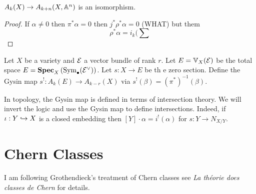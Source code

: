 \documentclass[12pt]{article}
\begin{document}
\begin{cor}
$A_k(X) \to A_{k+n}(X, \mathbb{A}^n)$ is an isomorphism. 
\end{cor}

\begin{proof}
If $\alpha \neq 0$ then $\pi^* \alpha = 0$ then $j^* \rho^* \alpha = 0$ (WHAT) but them
\[ \rho^* \alpha = i_k (\sum \]
\end{proof}

\newcommand{\V}{\mathbb{V}}

\begin{defn}
Let $X$ be a variety and $\mathcal{E}$ a vector bundle of rank $r$. Let $E = \V_X(\E)$ be the total space $E = \mathbf{Spec}_{X}\left( \mathrm{Sym}_{\bullet}\! \left( \mathcal{E}^\vee \right) \right)$. Let $s : X \to E$ be th e zero section. Define the Gysin map $s^! : A_k(E) \to A_{k-r}(X)$ via $s^!(\beta) = (\pi^*)^{-1}(\beta)$.
\end{defn}

\begin{rmk}
In topology, the Gysin map is defined in terms of intersection theory. We will invert the logic and use the Gysin map to define intersections. Indeed, if $\iota : Y \hookrightarrow X$ is a closed embedding then $[Y] \cdot \alpha = i^! (\alpha)$ for $s : Y \to N_{X/Y}$. 
\end{rmk}

\section{Chern Classes}

\newcommand{\cV}{\mathcal{V}}

\begin{rmk}
I am following Grothendieck's treatment of Chern classes see \textit{La th\'{e}orie does classes de Chern} for details.
\end{rmk}
\end{document}
